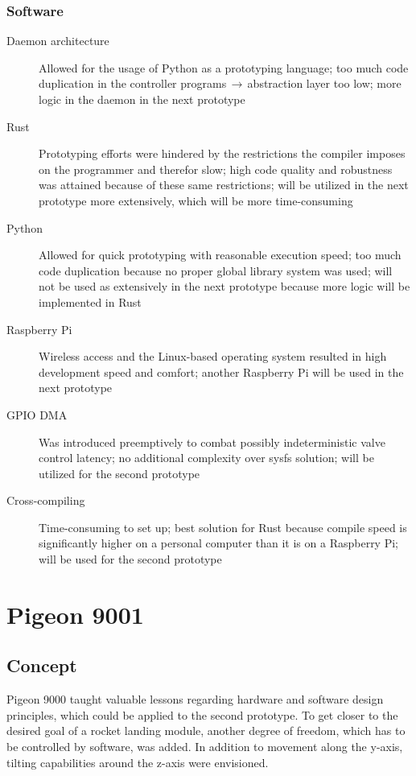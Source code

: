 \subsection{Software}
\author{Philip Trauner}

\begin{description}
\item [Daemon architecture] Allowed for the usage of Python as a prototyping language; too much code duplication in the controller programs$\,\to\,$abstraction layer too low; more logic in the daemon in the next prototype
\item [Rust] Prototyping efforts were hindered by the restrictions the compiler imposes on the programmer and therefor slow; high code quality and robustness was attained because of these same restrictions; will be utilized in the next prototype more extensively, which will be more time-consuming
\item [Python] Allowed for quick prototyping with reasonable execution speed; too much code duplication because no proper global library system was used; will not be used as extensively in the next prototype because more logic will be implemented in Rust
\item [Raspberry Pi] Wireless access and the Linux-based operating system resulted in high development speed and comfort; another Raspberry Pi will be used in the next prototype
\item [GPIO DMA] Was introduced preemptively to combat possibly indeterministic valve control latency; no additional complexity over sysfs solution; will be utilized for the second prototype 
\item [Cross-compiling] Time-consuming to set up; best solution for Rust because compile speed is significantly higher on a personal computer than it is on a Raspberry Pi; will be used for the second prototype 
\end{description}


\chapter{Pigeon 9001}
\section{Concept}

Pigeon 9000 taught valuable lessons regarding hardware and software design principles, which could be applied to the second prototype. To get closer to the desired goal of a rocket landing module, another degree of freedom, which has to be controlled by software, was added. In addition to movement along the y-axis, tilting capabilities around the z-axis were envisioned. 

